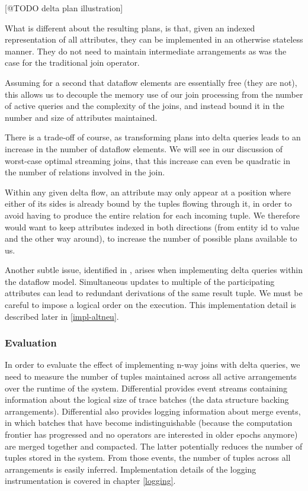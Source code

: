 \documentclass[../catalog.tex]{subfiles}
\begin{document}
[@TODO delta plan illustration]

What is different about the resulting plans, is that, given an indexed
representation of all attributes, they can be implemented in an
otherwise stateless manner. They do not need to maintain intermediate
arrangements as was the case for the traditional join operator.

Assuming for a second that dataflow elements are essentially free
(they are not), this allows us to decouple the memory use of our join
processing from the number of active queries and the complexity of the
joins, and instead bound it in the number and size of attributes
maintained.

There is a trade-off of course, as transforming plans into delta
queries leads to an increase in the number of dataflow elements. We
will see in our discussion of worst-case optimal streaming joins, that
this increase can even be quadratic in the number of relations
involved in the join.

Within any given delta flow, an attribute may only appear at a
position where either of its sides is already bound by the tuples
flowing through it, in order to avoid having to produce the entire
relation for each incoming tuple. We therefore would want to keep
attributes indexed in both directions (from entity id to value and the
other way around), to increase the number of possible plans available
to us.

Another subtle issue, identified in \cite{dogsdogsdogs}, arises when
implementing delta queries within the dataflow model. Simultaneous
updates to multiple of the participating attributes can lead to
redundant derivations of the same result tuple. We must be careful to
impose a logical order on the execution. This implementation detail is
described later in \autoref{impl-altneu}.

\subsubsection{Evaluation}

In order to evaluate the effect of implementing n-way joins with delta
queries, we need to measure the number of tuples maintained across all
active arrangements over the runtime of the system. Differential
provides event streams containing information about the logical size
of trace batches (the data structure backing
arrangements). Differential also provides logging information about
merge events, in which batches that have become indistinguishable
(because the computation frontier has progressed and no operators are
interested in older epochs anymore) are merged together and
compacted. The latter potentially reduces the number of tuples stored
in the system. From those events, the number of tuples across all
arrangements is easily inferred. Implementation details of the logging
instrumentation is covered in chapter \ref{logging}.
\end{document}
